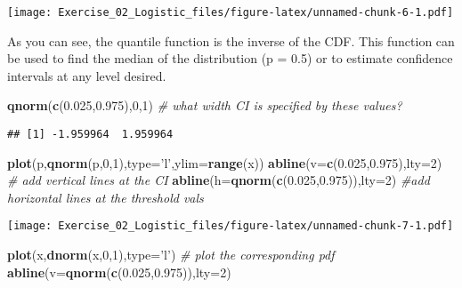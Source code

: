 \documentclass[]{article}
\newenvironment{Shaded}{\begin{snugshade}}{\end{snugshade}}
\newcommand{\KeywordTok}[1]{\textcolor[rgb]{0.13,0.29,0.53}{\textbf{#1}}}
\newcommand{\DataTypeTok}[1]{\textcolor[rgb]{0.13,0.29,0.53}{#1}}
\newcommand{\DecValTok}[1]{\textcolor[rgb]{0.00,0.00,0.81}{#1}}
\newcommand{\FloatTok}[1]{\textcolor[rgb]{0.00,0.00,0.81}{#1}}
\newcommand{\StringTok}[1]{\textcolor[rgb]{0.31,0.60,0.02}{#1}}
\newcommand{\CommentTok}[1]{\textcolor[rgb]{0.56,0.35,0.01}{\textit{#1}}}
\newcommand{\NormalTok}[1]{#1}
\begin{document}
\texttt{[image: Exercise\_02\_Logistic\_files/figure-latex/unnamed-chunk-6-1.pdf]}

As you can see, the quantile function is the inverse of the CDF. This
function can be used to find the median of the distribution (p = 0.5) or
to estimate confidence intervals at any level desired.

\begin{Shaded}
\begin{Highlighting}[]
\KeywordTok{qnorm}\NormalTok{(}\KeywordTok{c}\NormalTok{(}\FloatTok{0.025}\NormalTok{,}\FloatTok{0.975}\NormalTok{),}\DecValTok{0}\NormalTok{,}\DecValTok{1}\NormalTok{)           }\CommentTok{# what width CI is specified by these values?}
\end{Highlighting}
\end{Shaded}

\begin{verbatim}
## [1] -1.959964  1.959964
\end{verbatim}

\begin{Shaded}
\begin{Highlighting}[]
\KeywordTok{plot}\NormalTok{(p,}\KeywordTok{qnorm}\NormalTok{(p,}\DecValTok{0}\NormalTok{,}\DecValTok{1}\NormalTok{),}\DataTypeTok{type=}\StringTok{'l'}\NormalTok{,}\DataTypeTok{ylim=}\KeywordTok{range}\NormalTok{(x))}
\KeywordTok{abline}\NormalTok{(}\DataTypeTok{v=}\KeywordTok{c}\NormalTok{(}\FloatTok{0.025}\NormalTok{,}\FloatTok{0.975}\NormalTok{),}\DataTypeTok{lty=}\DecValTok{2}\NormalTok{)  }\CommentTok{# add vertical lines at the CI}
\KeywordTok{abline}\NormalTok{(}\DataTypeTok{h=}\KeywordTok{qnorm}\NormalTok{(}\KeywordTok{c}\NormalTok{(}\FloatTok{0.025}\NormalTok{,}\FloatTok{0.975}\NormalTok{)),}\DataTypeTok{lty=}\DecValTok{2}\NormalTok{)   }\CommentTok{#add horizontal lines at the threshold vals}
\end{Highlighting}
\end{Shaded}

\texttt{[image: Exercise\_02\_Logistic\_files/figure-latex/unnamed-chunk-7-1.pdf]}

\begin{Shaded}
\begin{Highlighting}[]
\KeywordTok{plot}\NormalTok{(x,}\KeywordTok{dnorm}\NormalTok{(x,}\DecValTok{0}\NormalTok{,}\DecValTok{1}\NormalTok{),}\DataTypeTok{type=}\StringTok{'l'}\NormalTok{)       }\CommentTok{# plot the corresponding pdf}
\KeywordTok{abline}\NormalTok{(}\DataTypeTok{v=}\KeywordTok{qnorm}\NormalTok{(}\KeywordTok{c}\NormalTok{(}\FloatTok{0.025}\NormalTok{,}\FloatTok{0.975}\NormalTok{)),}\DataTypeTok{lty=}\DecValTok{2}\NormalTok{)}
\end{Highlighting}
\end{Shaded}
\end{document}
